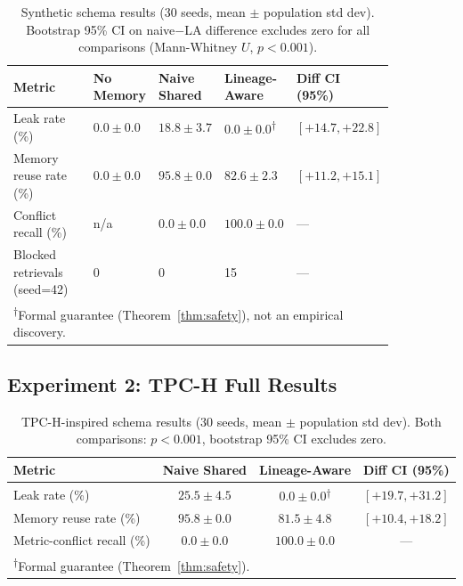 \documentclass[9pt,twocolumn,twoside]{extarticle}
\begin{document}
\begin{table}[h]
\centering
\caption{Synthetic schema results (30 seeds, mean $\pm$ population std dev).
Bootstrap 95\% CI on naive$-$LA difference excludes zero for all comparisons
(Mann-Whitney $U$, $p < 0.001$).}
\label{tab:results1}
\small
\begin{tabular}{@{}p{0.24\linewidth}p{0.13\linewidth}p{0.15\linewidth}p{0.17\linewidth}p{0.16\linewidth}@{}}
\toprule
\textbf{Metric} & \textbf{No Memory} & \textbf{Naive Shared} & \textbf{Lineage-Aware} & \textbf{Diff CI (95\%)} \\
\midrule
Leak rate (\%)           & $0.0 \pm 0.0$ & $18.8 \pm 3.7$ & $0.0 \pm 0.0$\textsuperscript{$\dagger$} & $[+14.7, +22.8]$ \\
Memory reuse rate (\%)   & $0.0 \pm 0.0$ & $95.8 \pm 0.0$ & $82.6 \pm 2.3$                           & $[+11.2, +15.1]$ \\
Conflict recall (\%)     & n/a           & $0.0 \pm 0.0$  & $100.0 \pm 0.0$                          & --- \\
Blocked retrievals (seed=42) & 0         & 0              & 15                                       & --- \\
\bottomrule
\multicolumn{5}{l}{\textsuperscript{$\dagger$}Formal guarantee (Theorem~\ref{thm:safety}), not an empirical discovery.}
\end{tabular}
\end{table}

\subsection{Experiment 2: TPC-H Full Results}
\begin{table}[h]
\centering
\caption{TPC-H-inspired schema results (30 seeds, mean $\pm$ population std dev).
Both comparisons: $p < 0.001$, bootstrap 95\% CI excludes zero.}
\label{tab:results2}
\begin{tabular}{@{}lccc@{}}
\toprule
\textbf{Metric} & \textbf{Naive Shared} & \textbf{Lineage-Aware} & \textbf{Diff CI (95\%)} \\
\midrule
Leak rate (\%)            & $25.5 \pm 4.5$ & $0.0 \pm 0.0$\textsuperscript{$\dagger$} & $[+19.7, +31.2]$ \\
Memory reuse rate (\%)    & $95.8 \pm 0.0$ & $81.5 \pm 4.8$                           & $[+10.4, +18.2]$ \\
Metric-conflict recall (\%) & $0.0 \pm 0.0$ & $100.0 \pm 0.0$                         & --- \\
\bottomrule
\multicolumn{4}{l}{\textsuperscript{$\dagger$}Formal guarantee (Theorem~\ref{thm:safety}).}
\end{tabular}
\end{table}
\end{document}

